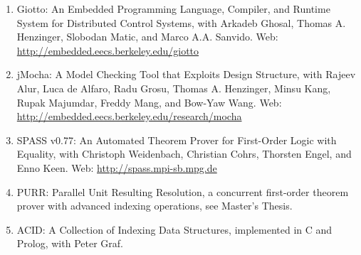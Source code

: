 {\begin{enumerate}
\item Giotto: An Embedded Programming Language, Compiler, and Runtime System for Distributed Control Systems,
with Arkadeb Ghosal, Thomas A. Henzinger, Slobodan Matic, and Marco A.A. Sanvido.
Web: \url{http://embedded.eecs.berkeley.edu/giotto}

\item jMocha: A Model Checking Tool that Exploits Design Structure,
with Rajeev Alur, Luca de Alfaro, Radu Grosu, Thomas A. Henzinger,
Minsu Kang, Rupak Majumdar, Freddy Mang, and Bow-Yaw Wang.  Web:
\url{http://embedded.eecs.berkeley.edu/research/mocha}

\item SPASS v0.77: An Automated Theorem Prover for First-Order Logic with Equality,
with Christoph Weidenbach, Christian Cohrs, Thorsten Engel, and Enno
Keen.  Web: \url{http://spass.mpi-sb.mpg.de}

\item PURR: Parallel Unit Resulting Resolution, a concurrent first-order theorem prover
with advanced indexing operations, see Master's Thesis.

\item ACID: A Collection of Indexing Data Structures, implemented in C and Prolog,
with Peter Graf.
\end{enumerate}
}

